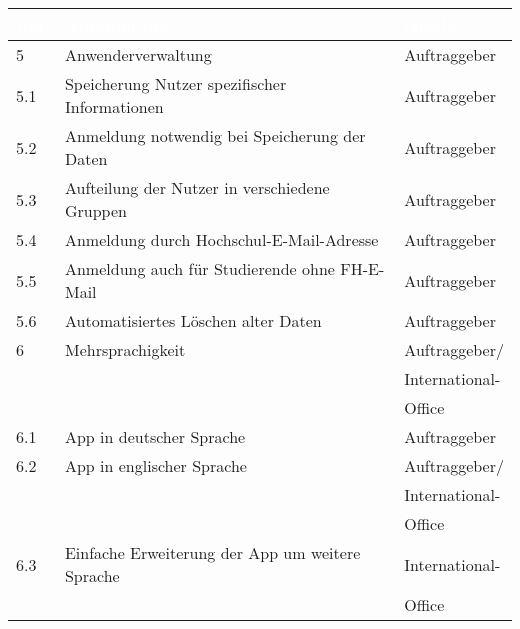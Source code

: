 \begin{table}[H]
\begin{center}
  \begin{tabular}{| l | l | l |}
 
\hline
\rowcolor{Gray}
\textcolor{white}{\textbf{Ref.}} & \textcolor{white}{\textbf{Anforderung}} & \textcolor{white}{\textbf{Quelle}} \\ 

\hline    
\rowcolor{LGray} 						
5		& Anwenderverwaltung								& Auftraggeber \\
\hline
5.1		& Speicherung Nutzer spezifischer Informationen		& Auftraggeber \\
\hline
5.2		& Anmeldung notwendig bei Speicherung der Daten 	& Auftraggeber \\
\hline
5.3		& Aufteilung der Nutzer in verschiedene Gruppen		& Auftraggeber \\
\hline
5.4		& Anmeldung durch Hochschul-E-Mail-Adresse			& Auftraggeber \\
\hline
5.5		& Anmeldung auch für Studierende ohne FH-E-Mail		& Auftraggeber \\
\hline
5.6		& Automatisiertes Löschen alter Daten				& Auftraggeber \\

\hline    
\rowcolor{LGray} 						
6		& Mehrsprachigkeit									& Auftraggeber/		\\ \rowcolor{LGray}
		&													& International-	\\ \rowcolor{LGray}
		&													& Office			\\ 
\hline
6.1		& App in deutscher Sprache							& Auftraggeber 		\\
\hline
6.2		& App in englischer Sprache 						& Auftraggeber/		\\
		&													& International-	\\
		&													& Office 			\\
\hline
6.3		& Einfache Erweiterung der App um weitere Sprache	& International-	\\
		&													& Office 			\\


\end{tabular}
\end{center}
\end{table}
